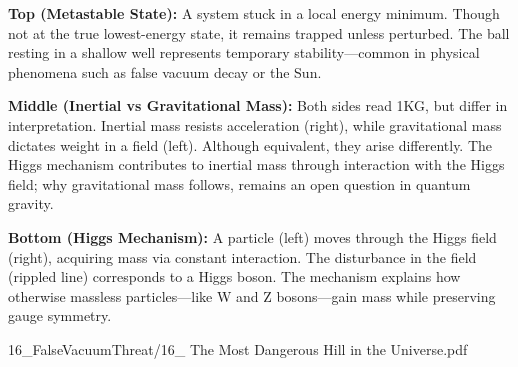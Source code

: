 \begin{SideNotePage}{
    \textbf{Top (Metastable State):}  
    A system stuck in a local energy minimum. Though not at the true lowest-energy state, it remains trapped unless perturbed. The ball resting in a shallow well represents temporary stability—common in physical phenomena such as false vacuum decay or the Sun. \par
  
    \textbf{Middle (Inertial vs Gravitational Mass):}  
    Both sides read \QSOpen{}1KG,\QSClose{} but differ in interpretation. Inertial mass resists acceleration (right), while gravitational mass dictates weight in a field (left). Although equivalent, they arise differently. The Higgs mechanism contributes to inertial mass through interaction with the Higgs field; why gravitational mass follows, remains an open question in quantum gravity. \par
  
    \textbf{Bottom (Higgs Mechanism):}  
    A particle (left) moves through the Higgs field (right), acquiring mass via constant interaction. The disturbance in the field (rippled line) corresponds to a Higgs boson. The mechanism explains how otherwise massless particles—like W and Z bosons—gain mass while preserving gauge symmetry. \par
}{16_FalseVacuumThreat/16_ The Most Dangerous Hill in the Universe.pdf}
\end{SideNotePage}
